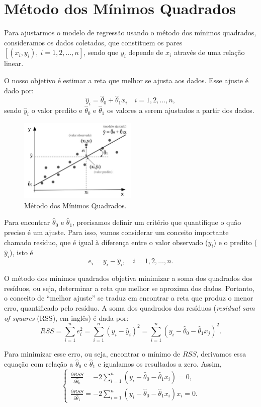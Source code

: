 \documentclass{article}
\begin{document}
\section{Método dos Mínimos Quadrados}
Para ajustarmos o modelo de regressão usando o método dos mínimos quadrados, consideramos os dados coletados, que constituem os pares $[(x_i, y_i), \ i = 1, 2, \ldots, n]$, sendo que $y_i$ depende de $x_i$ através de uma relação linear.

O nosso objetivo é estimar a reta que melhor se ajusta aos dados. Esse ajuste é dado por:
    $$
    \hat{y}_i = \hat{\theta}_0 + \hat{\theta}_1 x_i \quad i = 1, 2, \ldots, n,
    $$
sendo $\hat{y}_i$ o valor predito e $\hat{\theta}_0$ e $\hat{\theta}_1$ os valores a serem ajustados a partir dos dados.

\begin{figure}[H]
    \centering
    \includegraphics[width=0.5\textwidth]{figuras/metodo_minimos_quadrados.png}
    \caption{Método dos Mínimos Quadrados.}
    \label{fig:metodo_minimos_quadrados}
\end{figure}

Para encontrar $\hat{\theta}_0$ e $\hat{\theta}_1$, precisamos definir um critério que quantifique o quão preciso é um ajuste. Para isso, vamos considerar um conceito importante chamado resíduo, que é igual à diferença entre o valor observado ($y_i$) e o predito ($\hat{y}_i$), isto é
    $$
    e_i = y_i - \hat{y}_i, \quad i = 1, 2, \ldots, n.
    $$

O método dos mínimos quadrados objetiva minimizar a soma dos quadrados dos resíduos, ou seja, determinar a reta que melhor se aproxima dos dados. Portanto, o conceito de ``melhor ajuste'' se traduz em encontrar a reta que produz o menor erro, quantificado pelo resíduo.
A soma dos quadrados dos resíduos (\textit{residual sum of squares} (RSS), em inglês) é dada por:
    $$
    RSS = \sum_{i=1}^n e_i^2 = \sum_{i=1}^n (y_i - \hat{y}_i)^2 = \sum_{i=1}^n (y_i - \hat{\theta}_0 - \hat{\theta}_1 x_j)^2.
    $$

Para minimizar esse erro, ou seja, encontrar o mínimo de $RSS$, derivamos essa equação com relação a $\hat{\theta}_0$ e $\hat{\theta}_1$ e igualamos os resultados a zero. Assim,
    $$
    \begin{cases}
    \frac{\partial RSS}{\partial \hat{\theta}_0} = -2\sum_{i=1}^n (y_i - \hat{\theta}_0 - \hat{\theta}_1 x_i) = 0, \\
    \frac{\partial RSS}{\partial \hat{\theta}_1} = -2\sum_{i=1}^n (y_i - \hat{\theta}_0 - \hat{\theta}_1 x_i)x_i = 0.
    \end{cases}
    $$
\end{document}
